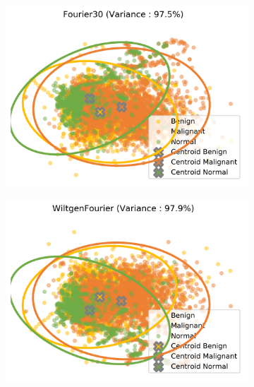 \begin{figure}[H]
    \begin{subfigure}{.45\textwidth}
      \includegraphics[width=\textwidth]{contents/chapter_4/resources/visualisation_frequency_Fourier30.png}
    \end{subfigure}
    \begin{subfigure}{.45\textwidth}
      \includegraphics[width=\textwidth]{contents/chapter_4/resources/visualisation_frequency_WiltgenFourier.png}
    \end{subfigure}
    

\end{figure}
